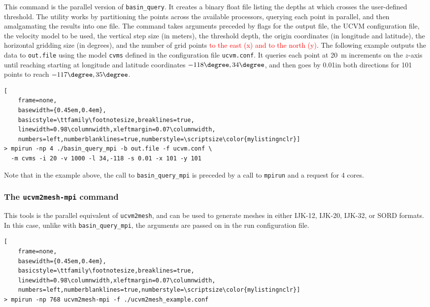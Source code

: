 This command is the parallel version of \texttt{basin\_query}. It creates a binary float file listing the depths at which \vs{} crosses the user-defined threshold. The utility works by partitioning the points across the available processors, querying each point in parallel, and then amalgamating the results into one file. The command takes arguments preceded by flags for the output file, the UCVM configuration file, the velocity model to be used, the vertical step size (in meters), the threshold depth, the origin coordinates (in longitude and latitude), the horizontal gridding size (in degrees), and the number of grid points \textcolor{red}{to the east (x) and to the north (y)}. The following example outputs the data to \texttt{out.file} using the model \texttt{cvms} defined in the configuration file \texttt{ucvm.conf}. It queries each point at 20~m increments on the $z$-axis until reaching  starting at longitude and latitude coordinates $-118\degree, 34\degree$, and then goes by 0.01\textdegree in both directions for 101 points to reach $-117\degree, 35\degree$.

\begin{lstlisting}[
	frame=none,
	basewidth={0.45em,0.4em},
	basicstyle=\ttfamily\footnotesize,breaklines=true,
	linewidth=0.98\columnwidth,xleftmargin=0.07\columnwidth,
	numbers=left,numberblanklines=true,numberstyle=\scriptsize\color{mylistingnclr}]
> mpirun -np 4 ./basin_query_mpi -b out.file -f ucvm.conf \
  -m cvms -i 20 -v 1000 -l 34,-118 -s 0.01 -x 101 -y 101
\end{lstlisting}

Note that in the example above, the call to \texttt{basin\_query\_mpi} is preceded by a call to \texttt{mpirun} and a request for 4 cores.

\subsubsection{The \textup{\texttt{ucvm2mesh-mpi}} command}

This tools is the parallel equivalent of \texttt{ucvm2mesh}, and can be used to generate meshes in either IJK-12, IJK-20, IJK-32, or SORD formats. In this case, unlike with \texttt{basin\_query\_mpi}, the arguments are passed on in the run configuration file.

\begin{lstlisting}[
	frame=none,
	basewidth={0.45em,0.4em},
	basicstyle=\ttfamily\footnotesize,breaklines=true,
	linewidth=0.98\columnwidth,xleftmargin=0.07\columnwidth,
	numbers=left,numberblanklines=true,numberstyle=\scriptsize\color{mylistingnclr}]
> mpirun -np 768 ucvm2mesh-mpi -f ./ucvm2mesh_example.conf
\end{lstlisting}


